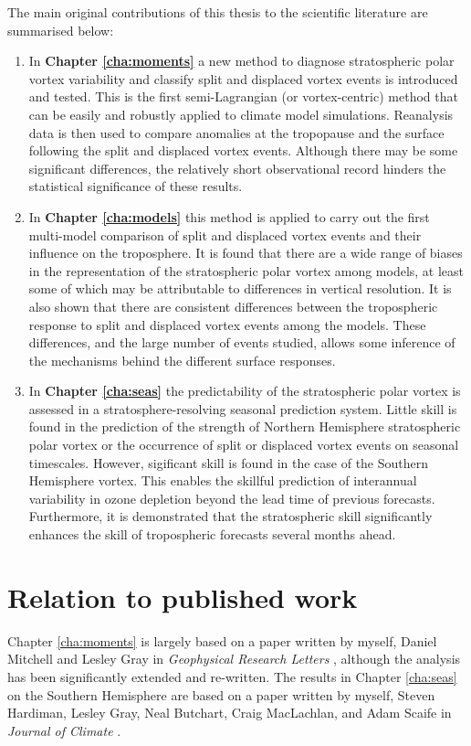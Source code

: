 The main original contributions of this thesis to the scientific literature are
summarised below:
\begin{enumerate}[1.]
\item In \textbf{Chapter \ref{cha:moments}} a new method to diagnose
  stratospheric polar vortex variability and classify split and displaced vortex
  events is introduced and tested. This is the first semi-Lagrangian (or
  vortex-centric) method that can be easily and robustly applied to climate
  model simulations. Reanalysis data is then used to compare anomalies at the
  tropopause and the surface following the split and displaced vortex
  events. Although there may be some significant differences, the relatively
  short observational record hinders the statistical significance of these
  results.

\item In \textbf{Chapter \ref{cha:models}} this method is applied to carry out
  the first multi-model comparison of split and displaced vortex events and
  their influence on the troposphere. It is found that there are a wide range of
  biases in the representation of the stratospheric polar vortex among models,
  at least some of which may be attributable to differences in vertical
  resolution. It is also shown that there are consistent differences between the
  tropospheric response to split and displaced vortex events among the
  models. These differences, and the large number of events studied, allows some
  inference of the mechanisms behind the different surface responses.

\item In \textbf{Chapter \ref{cha:seas}} the predictability of the stratospheric
  polar vortex is assessed in a stratosphere-resolving seasonal prediction
  system. Little skill is found in the prediction of the strength of Northern
  Hemisphere stratospheric polar vortex or the occurrence of split or displaced
  vortex events on seasonal timescales. However, sigificant skill is found in
  the case of the Southern Hemisphere vortex. This enables the skillful
  prediction of interannual variability in ozone depletion beyond the lead time
  of previous forecasts. Furthermore, it is demonstrated that the stratospheric
  skill significantly enhances the skill of tropospheric forecasts several
  months ahead. 

\end{enumerate}

\section{Relation to published work}
Chapter \ref{cha:moments} is largely based on a paper written by myself, Daniel
Mitchell and Lesley Gray in \emph{Geophysical Research Letters}
\citep{Seviour2013}, although the analysis has been significantly extended and
re-written. The results in Chapter \ref{cha:seas} on the Southern Hemisphere are
based on a paper written by myself, Steven Hardiman, Lesley Gray, Neal Butchart,
Craig MacLachlan, and Adam Scaife in \emph{Journal of Climate}
\citep{Seviour2014}. 

